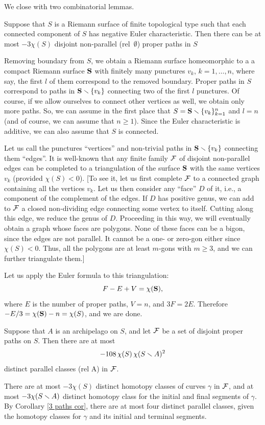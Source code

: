 \msk
We close with two combinatorial lemmas. 
\begin{lem}
  Suppose that $S$ is a Riemann surface of finite topological type such that each connected component of $S$
has negative Euler characteristic. 
  Then there can be at most $-3\chi(S)$ disjoint non-parallel (rel~$\emptyset$) proper paths in $S$
\end{lem}
%
\begin{pf}
  Removing boundary from $S$, we obtain a Riemann surface homeomorphic to a
a compact Riemann surface ${\mathbf{S}}$ with finitely many punctures $v_k$, $k=1,\dots, n$,  
where say, the first $l$ of them  correspond to the removed boundary. 
Proper paths in $S$ correspond to  paths in ${\mathbf{S}}\smallsetminus \{v_k\}$ connecting 
two of the first $l$ punctures.
Of course, if we allow ourselves to connect other vertices as well, we obtain only more paths.
So, we can assume in the  first place that $S={\mathbf{S}}\smallsetminus \{v_k\}_{k=1}^n$ and $l=n$
(and of course, we can assume that $n\geq 1$). 
Since the Euler characteristic is additive, we can also assume that $S$ is connected.

Let us call the punctures ``vertices'' and non-trivial paths in ${\mathbf{S}}\smallsetminus \{v_k\}$ connecting them ``edges''.
It is well-known that any finite family ${\cal F}$ of  disjoint non-parallel edges can be completed
to  a triangulation of the surface ${\mathbf{S}}$ with the same vertices $v_k$ (provided $\chi(S)<0$). 
[To see it, let us first complete ${\cal F}$ to a connected graph containing all the vertices $v_k$.  
Let us then consider any ``face'' $D$ of it, i.e., a component of the complement of the edges.
If $D$ has positive genus, we can add to ${\cal F}$ a closed non-dividing edge connecting some vertex to 
itself. Cutting along this edge, we reduce the genus of $D$. Proceeding in this way,  
we will eventually obtain a graph whose faces are polygons.
None of these faces can be a bigon, since the edges are not parallel.
It cannot be a one- or zero-gon either since $\chi(S)<0$.  
Thus, all the polygons are at least $m$-gons with $m\geq 3$, 
and  we can further triangulate them.]
      
   Let us apply the Euler formula to this triangulation:
 $$
    F - E + V = \chi({\mathbf{S}}),
 $$
  where $E$ is the number of proper paths, $V = n$, and $3F = 2E$.
  Therefore $- E/3  = \chi({\mathbf{S}})-n = \chi(S)$,
  and we are done.
\end{pf}

\begin{lem}\label{number of par classes}
  Suppose that $A$ is an archipelago on $S$,
  and let ${\cal F}$ be a set of disjoint proper paths on $S$.
  Then there are at most 
  $$
  - 108\, \chi(S)\, \chi(S\smallsetminus A)^2
  $$
  distinct parallel classes (rel A) in ${\cal F}$.
\end{lem}
%
\begin{pf}
  There are at most $-3\chi(S)$ distinct homotopy classes of curves $\gamma$ in ${\cal F}$,
  and at most $-3\chi(S \smallsetminus A)$ distinct homotopy class 
  for the initial and final segments of $\gamma$.
  By  Corollary \ref{3 paths cor},  there are at most four distinct parallel classes,
  given the homotopy classes for $\gamma$ and its initial and terminal segments.
\end{pf}

